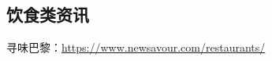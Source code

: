 \subsection{饮食类资讯}

寻味巴黎：\href{https://www.newsavour.com/restaurants/}{https://www.newsavour.com/restaurants/}
